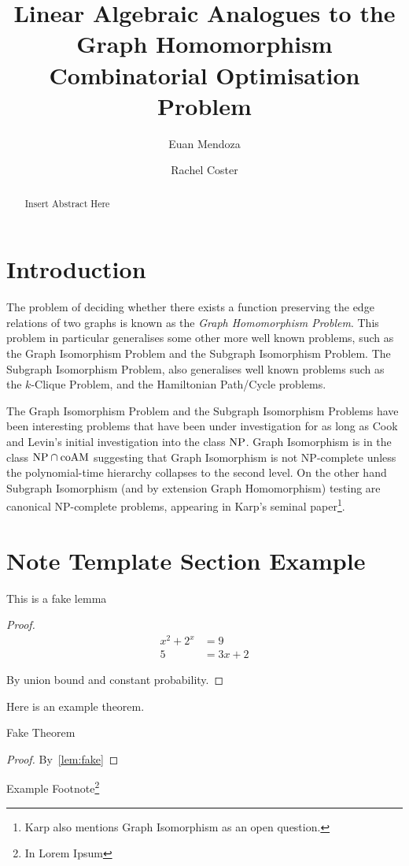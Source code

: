 \documentclass[a4paper,12pt]{article}
\title{
    Linear Algebraic Analogues to the Graph Homomorphism Combinatorial Optimisation Problem
}
\author{
    Euan Mendoza
    \and
    Rachel Coster
}
\begin{document}
\maketitle

\begin{abstract}
    Insert Abstract Here
\end{abstract}
\newpage

\tableofcontents

\section{Introduction}\label{sec:introduction}

The problem of deciding whether there exists a function preserving the edge relations of two graphs is known as the \textit{Graph Homomorphism Problem}. This problem in particular generalises some other more well known problems, such as the Graph Isomorphism Problem and the Subgraph Isomorphism Problem. The Subgraph Isomorphism Problem, also generalises well known problems such as the $k$-Clique Problem, and the Hamiltonian Path/Cycle problems.

The Graph Isomorphism Problem and the Subgraph Isomorphism Problems have been interesting problems that have been under investigation for as long as Cook and Levin's initial investigation into the class $\mathrm{NP}$. Graph Isomorphism is in the class $\mathrm{NP} \cap \mathrm{coAM}$ suggesting that Graph Isomorphism is not NP-complete unless the polynomial-time hierarchy collapses to the second level. On the other hand Subgraph Isomorphism (and by extension Graph Homomorphism) testing are canonical NP-complete problems, appearing in Karp's seminal paper\footnote{Karp also mentions Graph Isomorphism as an open question.}.

\section{Note Template Section Example}

\begin{lemma}\label{lem:fake}
    This is a fake lemma
\end{lemma}

\begin{proof}
    \begin{align*}
      x^{2} + 2^{x} &= 9 \\
      5 &= 3x + 2
    \end{align*}

    By union bound and constant probability.
\end{proof}

Here is an example theorem.

\begin{theorem}\label{thm:fake}
    Fake Theorem
\end{theorem}

\begin{proof}
    By~\cref{lem:fake}
\end{proof}

Example Footnote\footnote{In Lorem Ipsum}
\end{document}
